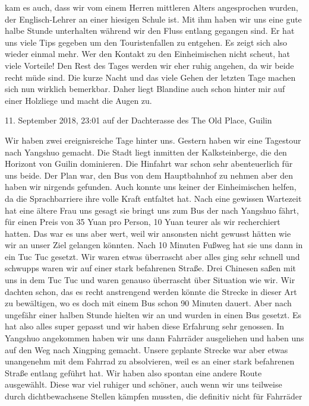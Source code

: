 \documentclass[11pt]{book}
\begin{document}
kam es auch, dass wir vom einem Herren mittleren Alters angesprochen wurden, der Englisch-Lehrer an einer 
hiesigen Schule ist. Mit ihm haben wir uns eine gute halbe Stunde unterhalten während wir den Fluss entlang 
gegangen sind. Er hat uns viele Tips gegeben um den Touristenfallen zu entgehen. Es zeigt sich also wieder 
einmal mehr. Wer den Kontakt zu den Einheimischen nicht scheut, hat viele Vorteile!
Den Rest des Tages werden wir eher ruhig angehen, da wir beide recht müde sind. Die kurze Nacht und das viele
Gehen der letzten Tage machen sich nun wirklich bemerkbar. Daher liegt Blandine auch schon hinter mir auf einer
Holzliege und macht die Augen zu.

11. September 2018, 23:01 auf der Dachterasse des The Old Place, Guilin

Wir haben zwei ereignisreiche Tage hinter uns. Gestern haben wir eine Tagestour nach Yangshuo gemacht. Die 
Stadt liegt inmitten der Kalksteinberge, die den Horizont von Guilin dominieren. Die Hinfahrt war schon sehr 
abenteuerlich für uns beide. Der Plan war, den Bus von dem Hauptbahnhof zu nehmen aber den haben wir nirgends 
gefunden. Auch konnte uns keiner der Einheimischen helfen, da die Sprachbarriere ihre volle Kraft entfaltet hat. 
Nach eine gewissen Wartezeit hat eine ältere Frau uns gesagt sie bringt uns zum Bus der nach Yangshuo fährt, für 
einen Preis von 35 Yuan pro Person, 10 Yuan teurer als wir recherchiert hatten. Das war es uns aber wert, weil 
wir ansonsten nicht gewusst hätten wie wir an unser Ziel gelangen könnten. Nach 10 Minuten Fußweg hat sie uns 
dann in ein Tuc Tuc gesetzt. Wir waren etwas überrascht aber alles ging sehr schnell und schwupps waren wir 
auf einer stark befahrenen Straße. Drei Chinesen saßen mit uns in dem Tuc Tuc und waren genauso überrascht über 
Situation wie wir. Wir dachten schon, das es recht anstrengend werden könnte die Strecke in dieser Art zu 
bewältigen, wo es doch mit einem Bus schon 90 Minuten dauert. Aber nach ungefähr einer halben Stunde hielten wir
an und wurden in einen Bus gesetzt. Es hat also alles super gepasst und wir haben diese Erfahrung sehr genossen.
In Yangshuo angekommen haben wir uns dann Fahrräder ausgeliehen und haben uns auf den Weg nach Xingping gemacht.
Unsere geplante Strecke war aber etwas unangenehm mit dem Fahrrad zu absolvieren, weil es an einer stark befahrenen 
Straße entlang geführt hat. Wir haben also spontan eine andere Route ausgewählt. Diese war viel ruhiger und schöner, 
auch wenn wir uns teilweise durch dichtbewachsene Stellen kämpfen mussten, die definitiv nicht für Fahrräder 
\end{document}
